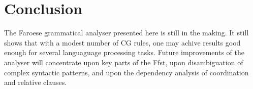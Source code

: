 \documentclass[11pt]{article}
\begin{document}
\section{Conclusion}

The Faroese grammatical analyser presented here is still in the making. It still shows that with a modest number of CG rules, one may achive results good enough for several languaguage processing tasks. Future improvements of the analyser will concentrate upon key parts of the Ffst, upon disambiguation of complex syntactic patterns, and upon the dependency analysis of coordination and relative clauses.


%


\end{document}
